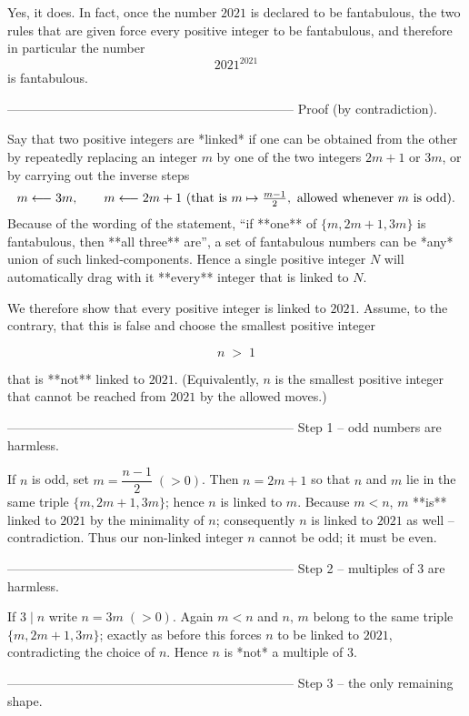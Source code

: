 Yes, it does.  
In fact, once the number \(2021\) is declared to be fantabulous, the two rules that are given force every positive integer to be fantabulous, and therefore in particular the number  
\[
2021^{2021}
\]
is fantabulous.

--------------------------------------------------------------------
Proof (by contradiction).

Say that two positive integers are *linked* if one can be obtained from the other by repeatedly replacing an integer \(m\) by one of the two integers \(2m+1\) or \(3m\), or by carrying out the inverse steps
\[
m\longleftarrow 3m,\qquad  
m\longleftarrow 2m+1
\ (\hbox{that is }m\mapsto \tfrac{m-1}{2},\hbox{ allowed whenever }m\text{ is odd}).
\]
Because of the wording of the statement, “if **one** of
\(\{m,2m+1,3m\}\) is fantabulous, then **all three** are”, a set of
fantabulous numbers can be *any* union of such linked‐components.  
Hence a single positive integer \(N\) will automatically drag with it **every** integer that is linked to \(N\).

We therefore show that every positive integer is linked to \(2021\).
Assume, to the contrary, that this is false and choose the smallest
positive integer

\[
n\;>\;1
\]

that is **not** linked to \(2021\).
(Equivalently, \(n\) is the smallest positive integer that cannot be
reached from \(2021\) by the allowed moves.)

--------------------------------------------------------------------
Step 1 –  odd numbers are harmless.

If \(n\) is odd, set \(m=\dfrac{n-1}{2}\;(>0)\).
Then \(n=2m+1\) so that \(n\) and \(m\) lie in the same triple
\(\{m,2m+1,3m\}\); hence \(n\) is linked to \(m\).
Because \(m<n\), \(m\) **is** linked to \(2021\) by the minimality of
\(n\); consequently \(n\) is linked to \(2021\) as well – contradiction.
Thus our non-linked integer \(n\) cannot be odd; it must be even.

--------------------------------------------------------------------
Step 2 –  multiples of \(3\) are harmless.

If \(3\mid n\) write \(n=3m\;(>0)\).
Again \(m<n\) and \(n,\,m\) belong to the same triple
\(\{m,2m+1,3m\}\); exactly as before this forces \(n\) to be linked to
\(2021\), contradicting the choice of \(n\).
Hence \(n\) is *not* a multiple of \(3\).

--------------------------------------------------------------------
Step 3 –  the only remaining shape.

